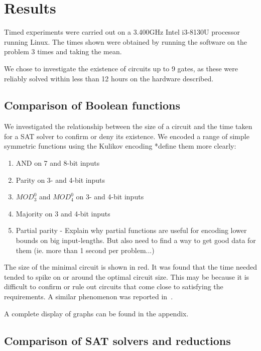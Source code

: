 \documentclass{article}
\begin{document}
\section{Results}

Timed experiments were carried out on a 3.400GHz Intel i3-8130U processor running Linux. The times shown were obtained by running the software on the problem 3 times and taking the mean.

We chose to investigate the existence of circuits up to 9 gates, as these were reliably solved within less than 12 hours on the hardware described.

\subsection{Comparison of Boolean functions}

We investigated the relationship between the size of a circuit and the time taken for a SAT solver to confirm or deny its existence. We encoded a range of simple symmetric functions using the Kulikov encoding *define them more clearly:

\begin{enumerate}
  \item AND on 7 and 8-bit inputs
  \item Parity on 3- and 4-bit inputs
  \item \(MOD^0_3\) and \(MOD^0_4\) on 3- and 4-bit inputs
  \item Majority on 3 and 4-bit inputs
  \item Partial parity - Explain why partial functions are useful for encoding lower bounds on big input-lengths. But also need to find a way to get good data for them (ie. more than 1 second per problem...)

\end{enumerate}

\begin{figure}[!ht]
\end{figure}
The size of the minimal circuit is shown in red. It was found that the time needed tended to spike on or around the optimal circuit size. This may be because it is difficult to confirm or rule out circuits that come close to satisfying the requirements. A similar phenomenon was reported in~\cite{estrada}.

A complete display of graphs can be found in the appendix.

\subsection{Comparison of SAT solvers and reductions}
\end{document}
